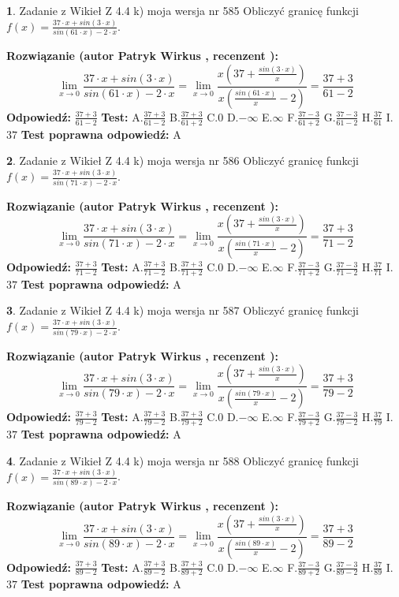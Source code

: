\documentclass[12pt, a4paper]{article}
\theoremstyle{definition} %
\newtheorem{zad}{}
\newcommand{\zadStart}[1]{\begin{zad}#1\newline}
\newcommand{\zadStop}{\end{zad}}
\newcommand{\rozwStart}[2]{\noindent \textbf{Rozwiązanie (autor #1 , recenzent #2): }\newline}
\newcommand{\rozwStop}{\newline}
\newcommand{\odpStart}{\noindent \textbf{Odpowiedź:}\newline}
\newcommand{\odpStop}{\newline}
\newcommand{\testStart}{\noindent \textbf{Test:}\newline}
\newcommand{\testStop}{\newline}
\newcommand{\kluczStart}{\noindent \textbf{Test poprawna odpowiedź:}\newline}
\newcommand{\kluczStop}{\newline}
\begin{document}
\zadStart{Zadanie z Wikieł Z 4.4 k) moja wersja nr 585}
Obliczyć granicę funkcji $f(x)=\frac{37\cdot x +sin(3\cdot x)}{sin(61\cdot x) -2\cdot x}$.
\zadStop
\rozwStart{Patryk Wirkus}{}
$$\lim\limits_{x\to 0}\frac{37\cdot x +sin(3\cdot x)}{sin(61\cdot x) -2\cdot x}
=\lim\limits_{x\to 0}\frac{x(37+\frac{sin(3\cdot x)}{x})}{x(\frac{sin(61\cdot x)}{x}-2)}
=\frac{37+3}{61-2}$$
\rozwStop
\odpStart
$\frac{37+3}{61-2}$
\odpStop
\testStart
A.$\frac{37+3}{61-2}$
B.$\frac{37+3}{61+2}$
C.$0$
D.$-\infty$
E.$\infty$
F.$\frac{37-3}{61+2}$
G.$\frac{37-3}{61-2}$
H.$\frac{37}{61}$
I.$37$
\testStop
\kluczStart
A
\kluczStop



\zadStart{Zadanie z Wikieł Z 4.4 k) moja wersja nr 586}
Obliczyć granicę funkcji $f(x)=\frac{37\cdot x +sin(3\cdot x)}{sin(71\cdot x) -2\cdot x}$.
\zadStop
\rozwStart{Patryk Wirkus}{}
$$\lim\limits_{x\to 0}\frac{37\cdot x +sin(3\cdot x)}{sin(71\cdot x) -2\cdot x}
=\lim\limits_{x\to 0}\frac{x(37+\frac{sin(3\cdot x)}{x})}{x(\frac{sin(71\cdot x)}{x}-2)}
=\frac{37+3}{71-2}$$
\rozwStop
\odpStart
$\frac{37+3}{71-2}$
\odpStop
\testStart
A.$\frac{37+3}{71-2}$
B.$\frac{37+3}{71+2}$
C.$0$
D.$-\infty$
E.$\infty$
F.$\frac{37-3}{71+2}$
G.$\frac{37-3}{71-2}$
H.$\frac{37}{71}$
I.$37$
\testStop
\kluczStart
A
\kluczStop



\zadStart{Zadanie z Wikieł Z 4.4 k) moja wersja nr 587}
Obliczyć granicę funkcji $f(x)=\frac{37\cdot x +sin(3\cdot x)}{sin(79\cdot x) -2\cdot x}$.
\zadStop
\rozwStart{Patryk Wirkus}{}
$$\lim\limits_{x\to 0}\frac{37\cdot x +sin(3\cdot x)}{sin(79\cdot x) -2\cdot x}
=\lim\limits_{x\to 0}\frac{x(37+\frac{sin(3\cdot x)}{x})}{x(\frac{sin(79\cdot x)}{x}-2)}
=\frac{37+3}{79-2}$$
\rozwStop
\odpStart
$\frac{37+3}{79-2}$
\odpStop
\testStart
A.$\frac{37+3}{79-2}$
B.$\frac{37+3}{79+2}$
C.$0$
D.$-\infty$
E.$\infty$
F.$\frac{37-3}{79+2}$
G.$\frac{37-3}{79-2}$
H.$\frac{37}{79}$
I.$37$
\testStop
\kluczStart
A
\kluczStop



\zadStart{Zadanie z Wikieł Z 4.4 k) moja wersja nr 588}
Obliczyć granicę funkcji $f(x)=\frac{37\cdot x +sin(3\cdot x)}{sin(89\cdot x) -2\cdot x}$.
\zadStop
\rozwStart{Patryk Wirkus}{}
$$\lim\limits_{x\to 0}\frac{37\cdot x +sin(3\cdot x)}{sin(89\cdot x) -2\cdot x}
=\lim\limits_{x\to 0}\frac{x(37+\frac{sin(3\cdot x)}{x})}{x(\frac{sin(89\cdot x)}{x}-2)}
=\frac{37+3}{89-2}$$
\rozwStop
\odpStart
$\frac{37+3}{89-2}$
\odpStop
\testStart
A.$\frac{37+3}{89-2}$
B.$\frac{37+3}{89+2}$
C.$0$
D.$-\infty$
E.$\infty$
F.$\frac{37-3}{89+2}$
G.$\frac{37-3}{89-2}$
H.$\frac{37}{89}$
I.$37$
\testStop
\kluczStart
A
\kluczStop
\end{document}
